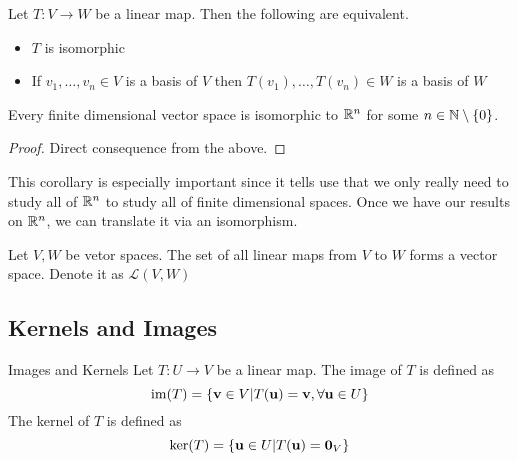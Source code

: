 \documentclass[a4paper]{article}
\begin{document}
\begin{thm}{}{} Let $T:V\to W$ be a linear map. Then the following are equivalent. 
\begin{itemize}
\item $T$ is isomorphic
\item If $v_1,\dots,v_n\in V$ is a basis of $V$ then $T(v_1),\dots,T(v_n)\in W$ is a basis of $W$
\end{itemize}
\end{thm}

\begin{crl}{}{} Every finite dimensional vector space is isomorphic to $\mathbb{R}^n$ for some $n\in\mathbb{N}\setminus\{0\}$. \tcbline
\begin{proof} Direct consequence from the above. 
\end{proof}
\end{crl}

This corollary is especially important since it tells use that we only really need to study all of $\mathbb{R}^n$ to study all of finite dimensional spaces. Once we have our results on $\mathbb{R}^n$, we can translate it via an isomorphism. 

\begin{prp}{}{} Let $V,W$ be vetor spaces. The set of all linear maps from $V$ to $W$ forms a vector space. Denote it as $\mathcal{L}(V,W)$
\end{prp}

\subsection{Kernels and Images}
\begin{defn}{Images and Kernels}{} Let $T:U\to V$ be a linear map. The image of $T$ is defined as $$\operatorname{im}(T)=\{\vb{v}\in V|T(\vb{u})=\vb{v}, \forall\vb{u}\in U\}$$ The kernel of $T$ is defined as $$\ker(T)=\{\vb{u}\in U|T(\vb{u})=\vb{0}_V\}$$
\end{defn}
\end{document}
